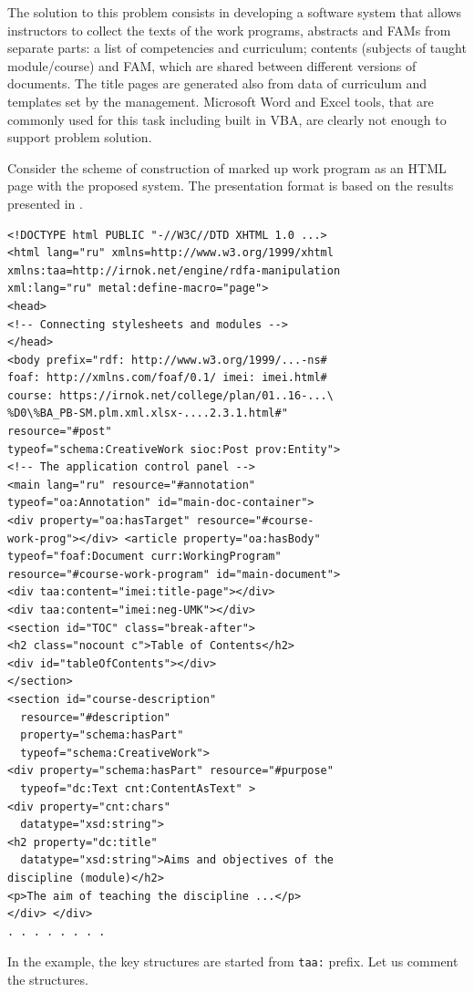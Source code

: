 \documentclass[conference,a4paper]{IEEEtran}
\begin{document}
The solution to this problem consists in developing a software system that allows instructors to collect the texts of the work programs, abstracts and FAMs from separate parts: a list of competencies and curriculum; contents (subjects of taught module/course) and FAM, which are shared between different versions of documents.  The title pages are generated also from data of curriculum and templates set by the management.  Microsoft Word and Excel tools, that are commonly used for this task including built in VBA, are clearly not enough to support problem solution.

Consider the scheme of construction of marked up work program as an HTML page with the proposed system.  The presentation format is based on the results presented in \cite{b4,b15}.

\begin{verbatim}
<!DOCTYPE html PUBLIC "-//W3C//DTD XHTML 1.0 ...>
<html lang="ru" xmlns=http://www.w3.org/1999/xhtml
xmlns:taa=http://irnok.net/engine/rdfa-manipulation
xml:lang="ru" metal:define-macro="page">
<head>
<!-- Connecting stylesheets and modules -->
</head>
<body prefix="rdf: http://www.w3.org/1999/...-ns#
foaf: http://xmlns.com/foaf/0.1/ imei: imei.html#
course: https://irnok.net/college/plan/01..16-...\
%D0\%BA_PB-SM.plm.xml.xlsx-....2.3.1.html#"
resource="#post"
typeof="schema:CreativeWork sioc:Post prov:Entity">
<!-- The application control panel -->
<main lang="ru" resource="#annotation"
typeof="oa:Annotation" id="main-doc-container">
<div property="oa:hasTarget" resource="#course-
work-prog"></div> <article property="oa:hasBody"
typeof="foaf:Document curr:WorkingProgram"
resource="#course-work-program" id="main-document">
<div taa:content="imei:title-page"></div>
<div taa:content="imei:neg-UMK"></div>
<section id="TOC" class="break-after">
<h2 class="nocount c">Table of Contents</h2>
<div id="tableOfContents"></div>
</section>
<section id="course-description"
  resource="#description"
  property="schema:hasPart"
  typeof="schema:CreativeWork">
<div property="schema:hasPart" resource="#purpose"
  typeof="dc:Text cnt:ContentAsText" >
<div property="cnt:chars"
  datatype="xsd:string">
<h2 property="dc:title"
  datatype="xsd:string">Aims and objectives of the
discipline (module)</h2>
<p>The aim of teaching the discipline ...</p>
</div> </div>
. . . . . . . .
\end{verbatim}

In the example, the key structures are started from \texttt{taa:} prefix. Let us comment the structures.
\end{document}
